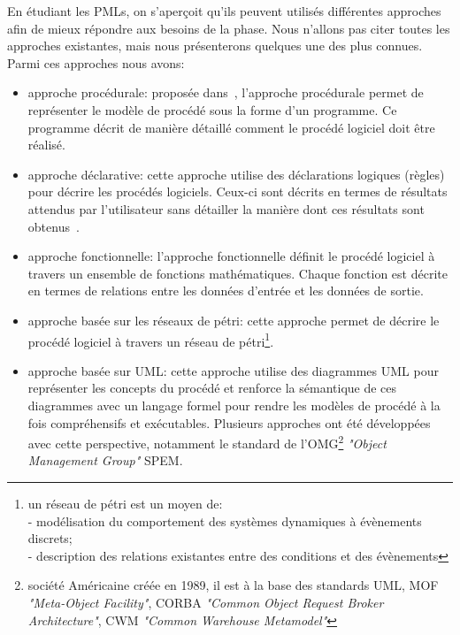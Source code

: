 En étudiant les PMLs, on s'aperçoit qu'ils peuvent utilisés différentes approches afin de mieux répondre aux besoins de la phase. Nous n'allons pas citer toutes les approches existantes, mais nous présenterons quelques une des plus connues. Parmi ces approches nous avons:
\begin{itemize}
\item approche procédurale: proposée dans~\cite{lo}, l'approche procédurale permet de représenter le modèle de procédé sous la forme d'un programme. Ce programme décrit de manière détaillé comment le procédé logiciel doit être réalisé.
\item approche déclarative: cette approche utilise des déclarations logiques (règles) pour décrire les procédés logiciels. Ceux-ci sont décrits en termes de résultats attendus par l'utilisateur sans détailler la manière dont ces résultats sont obtenus~\cite{lgw}.
\item approche fonctionnelle: l'approche fonctionnelle définit le procédé logiciel à travers un ensemble de fonctions mathématiques. Chaque fonction est décrite en termes de relations entre les données d'entrée et les données de sortie. 
\item approche basée sur les réseaux de pétri: cette approche permet de décrire le procédé logiciel à travers un réseau de pétri\footnote{un réseau de pétri est un moyen de: \\ - modélisation du comportement des systèmes dynamiques à évènements discrets;\\ - description des relations existantes entre des conditions et des évènements}.
\item approche basée sur UML: cette approche utilise des diagrammes UML pour représenter les concepts du procédé et renforce la sémantique de ces diagrammes avec un langage formel pour rendre les modèles de procédé à la fois compréhensifs et exécutables. 
Plusieurs approches ont été développées avec cette perspective, notamment le standard de l'OMG\footnote{société Américaine créée en 1989, il est à la base des standards UML, MOF \textit{"Meta-Object Facility"}, CORBA \textit{"Common Object Request Broker Architecture"}, CWM \textit{"Common Warehouse Metamodel"}} \textit{"Object Management Group"} SPEM.

\end{itemize}
